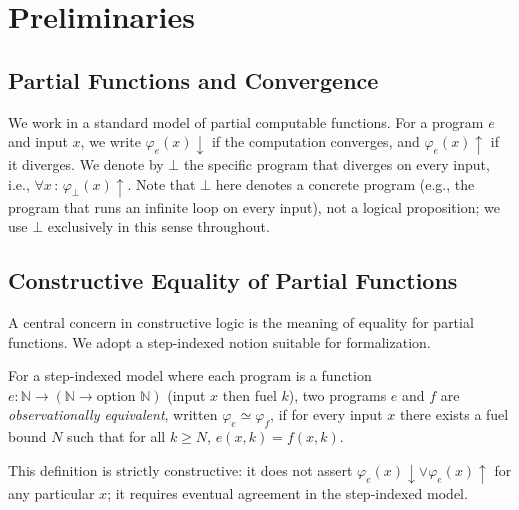 \documentclass{lmcs}
\begin{document}
\section{Preliminaries}
\label{sec:prelim}

\subsection{Partial Functions and Convergence}

We work in a standard model of partial computable functions. For a program
\(e\) and input \(x\), we write \(\varphi_e(x) \downarrow\) if the computation
converges, and \(\varphi_e(x) \uparrow\) if it diverges. We denote by \(\bot\)
the specific program that diverges on every input, i.e., \(\forall x\,:\,
\varphi_\bot(x) \uparrow\). Note that \(\bot\) here denotes a concrete
program (e.g., the program that runs an infinite loop on every input),
not a logical proposition; we use \(\bot\) exclusively in this sense
throughout.

\subsection{Constructive Equality of Partial Functions}

A central concern in constructive logic is the meaning of equality for partial
functions. We adopt a step-indexed notion suitable for formalization.

\begin{defi}
\label{def:obs-equiv}
For a step-indexed model where each program is a function \(e : \mathbb{N} \to
(\mathbb{N} \to \text{option } \mathbb{N})\) (input \(x\) then fuel \(k\)), two
programs \(e\) and \(f\) are \emph{observationally equivalent}, written
\(\varphi_e \simeq \varphi_f\), if for every input \(x\) there exists a fuel
bound \(N\) such that for all \(k \ge N\), \(e(x,k) = f(x,k)\).
\end{defi}

This definition is strictly constructive: it does not assert
\(\varphi_e(x)\!\downarrow \vee \varphi_e(x)\!\uparrow\) for any particular
\(x\); it requires eventual agreement in the step-indexed model.
\end{document}
